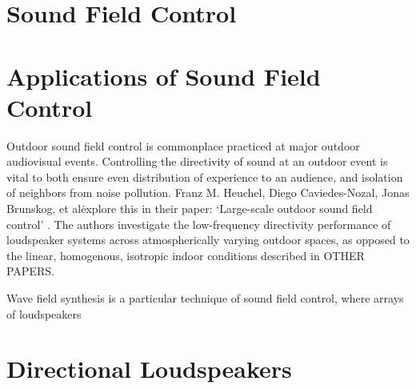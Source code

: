 \documentclass{report}
\begin{document}
    \section{Sound Field Control}
        

    \section{Applications of Sound Field Control}

        Outdoor sound field control is commonplace practiced at major outdoor audiovisual events.
        Controlling the directivity of sound at an outdoor event is vital to both ensure even distribution of experience to an audience, and isolation of neighbors from noise pollution.
        Franz M. Heuchel, Diego Caviedes-Nozal, Jonas Brunskog, et al\. explore this in their paper: `Large-scale outdoor sound field control' \cite{heuchel2020large}.
        The authors investigate the low-frequency directivity performance of loudspeaker systems across atmospherically varying outdoor spaces, as opposed to the linear, homogenous, isotropic indoor conditions described in OTHER PAPERS.



        Wave field synthesis is a particular technique of sound field control, where arrays of loudspeakers 

    \section{Directional Loudspeakers}
\end{document}
